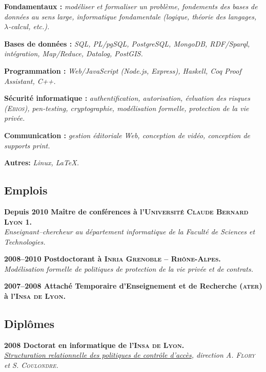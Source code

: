 \documentclass[12pt,a4paper]{article}
\newcommand{\activite}[1]{\textbf{#1}\xspace}
\newcommand{\comment}[1]{\textsl{#1}\xspace}
\newcommand{\INSAL}{\textsc{Insa de Lyon}\xspace}
\newcommand{\INRIARA}{\textsc{Inria Grenoble -- Rh\^one-Alpes}\xspace}
\newcommand{\UCBL}{\textsc{Universit{\'e} Claude Bernard Lyon 1}\xspace}
\newcommand{\ATER}{\textsc{ater}\xspace}
\begin{document}
  \activite{Fondamentaux :}
  \comment{modéliser et formaliser un problème, fondements des bases de données au sens large, informatique fondamentale (logique, théorie des langages, $\lambda$-calcul, etc.).}

  \activite{Bases de données :}
  \comment{SQL, PL/pgSQL, PostgreSQL, MongoDB, RDF/Sparql, intégration, Map/Reduce, Datalog, PostGIS.}

  \activite{Programmation :}
  \comment{Web/JavaScript (Node.js, Express), Haskell, Coq Proof Assistant, C++.}

  \activite{Sécurité informatique :}
    \comment{authentification, autorisation, évluation des risques (\textsc{Ebios}), pen-testing, cryptographie, modélisation formelle, protection de la vie privée.}

  \activite{Communication :}
  \comment{gestion éditoriale Web, conception de vidéo, conception de supports \emph{print}.}

  \activite{Autres:}
  \comment{Linux, \LaTeX.}

\subsection*{Emplois} 

  \activite{Depuis 2010 Maître de conférences à l'\UCBL.}\\
  \comment{Enseignant--chercheur au département informatique de la Faculté de Sciences et Technologies.} 
  
  \activite{2008--2010 Postdoctorant à \INRIARA.}\\
  \comment{Modélisation formelle de politiques de protection de la vie privée et de contrats.} 
  
  \activite{2007--2008 Attaché Temporaire d'Enseignement et de Recherche (\ATER) à l'\INSAL.}

\subsection*{Diplômes}

     \activite{2008 Doctorat en informatique de l'\INSAL.}\\
    \comment{\href{https://www.theses.fr/131879375}{Structuration relationnelle des politiques de contrôle d'accès}, direction \textsc{A. Flory} et S. \textsc{Coulondre}.}
    
\end{document}
